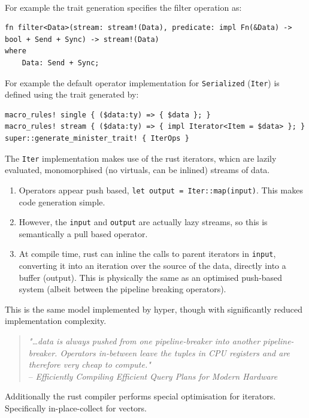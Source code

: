 \\ For example the trait generation specifies the filter operation as:
\begin{verbatim}
fn filter<Data>(stream: stream!(Data), predicate: impl Fn(&Data) -> bool + Send + Sync) -> stream!(Data)
where
    Data: Send + Sync; 
\end{verbatim}
For example the default operator implementation for \texttt{Serialized} (\texttt{Iter}) is defined using the trait generated by:
\begin{verbatim}
macro_rules! single { ($data:ty) => { $data }; }
macro_rules! stream { ($data:ty) => { impl Iterator<Item = $data> }; }
super::generate_minister_trait! { IterOps }
\end{verbatim}
The \texttt{Iter} implementation makes use of the rust iterators, whicn are lazily evaluated, monomorphised (no virtuals, can be inlined) streams of data.
\begin{enumerate}
    \setlength\itemsep{0em}
    \item Operators appear push based, \texttt{let output = Iter::map(input)}. This makes code generation simple.
    \item However, the \texttt{input} and \texttt{output} are actually lazy streams, so this is semantically a pull based operator.
    \item At compile time, rust can inline the calls to parent iterators in \texttt{input}, converting it into an iteration over the source of the data, directly into a buffer (output). This is physically the same as an optimised push-based system (albeit between the pipeline breaking operators).
\end{enumerate}
This is the same model implemented by hyper\cite{HyperQueryPlan}, though with significantly reduced implementation complexity.
\begin{quote}
    \textit{"\dots data is always pushed from one pipeline-breaker into another
        pipeline-breaker. Operators in-between leave the tuples in
        CPU registers and are therefore very cheap to compute."}
    \\ \vspace{0.5cm}
    \hfill -- \textit{Efficiently Compiling Efficient Query Plans
        for Modern Hardware\cite{HyperQueryPlan}}
\end{quote}
Additionally the rust compiler performs special optimisation for iterators. Specifically in-place-collect for vectors\cite{RustInPlaceCollect}.
